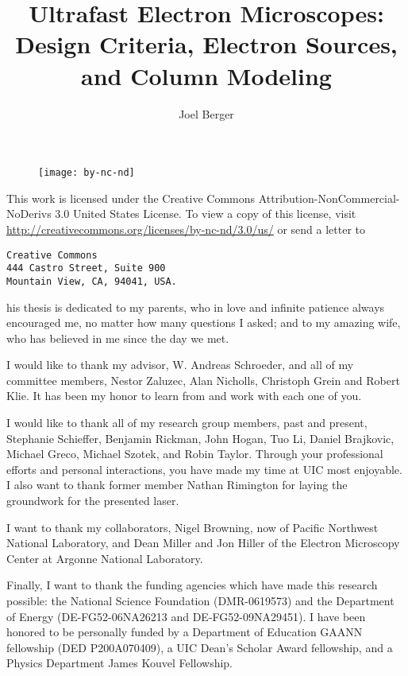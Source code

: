 \documentclass{uicthesi}
\title{Ultrafast Electron Microscopes: Design Criteria, Electron Sources, and Column Modeling}
\author{Joel Berger}
\begin{document}
\maketitle

\newpage
\begin{figure}
  \centering
  \texttt{[image: by-nc-nd]}
\end{figure}
This work is licensed under the Creative Commons Attribution-NonCommercial-NoDerivs 3.0 United States License.
To view a copy of this license, visit \url{http://creativecommons.org/licenses/by-nc-nd/3.0/us/} or send a letter to
\begin{verbatim}
Creative Commons
444 Castro Street, Suite 900
Mountain View, CA, 94041, USA.
\end{verbatim}


\dedication
This thesis is dedicated to my parents, who in love and infinite patience always encouraged me, no matter how many questions I asked; and to my amazing wife, who has believed in me since the day we met. 
 
\acknowledgment
I would like to thank my advisor, W. Andreas Schroeder, and all of my committee members, Nestor Zaluzec, %
Alan Nicholls, %
Christoph Grein and Robert Klie.
It has been my honor to learn from and work with each one of you.

I would like to thank all of my research group members, past and present, Stephanie Schieffer, Benjamin Rickman, John Hogan, Tuo Li, Daniel Brajkovic, Michael Greco, Michael Szotek, and Robin Taylor.
Through your professional efforts and personal interactions, you have made my time at UIC most enjoyable.
I also want to thank former member Nathan Rimington for laying the groundwork for the presented laser.

I want to thank my collaborators, Nigel Browning, now of Pacific Northwest National Laboratory, and Dean Miller and Jon Hiller of the Electron Microscopy Center at Argonne National Laboratory.

Finally, I want to thank the funding agencies which have made this research possible: 
the National Science Foundation (DMR-0619573) and the Department of Energy (DE-FG52-06NA26213 and DE-FG52-09NA29451).
I have been honored to be personally funded by a Department of Education GAANN fellowship (DED P200A070409), a UIC Dean's Scholar Award fellowship, and a Physics Department James Kouvel Fellowship.
\end{document}
